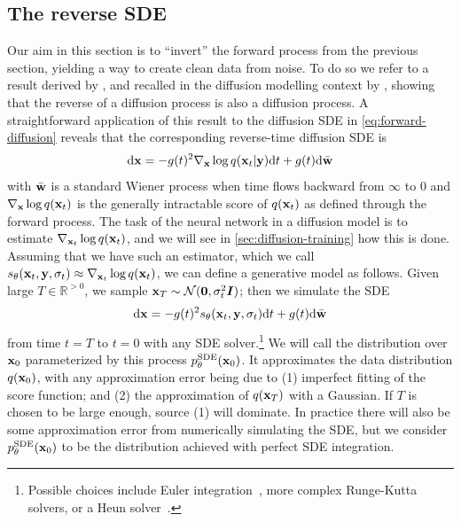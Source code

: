 \subsection{The reverse SDE} \label{sec:diffusion-forward-sde}
Our aim in this section is to ``invert'' the forward process from the previous section, yielding a way to create clean data from noise. To do so we refer to a result  derived by \citet{anderson1982reverse}, and recalled in the diffusion modelling context by \citet{song2020score}, showing that the reverse of a diffusion process is also a diffusion process. A straightforward application of this result to the diffusion SDE in \cref{eq:forward-diffusion} reveals that the corresponding reverse-time diffusion SDE is
\begin{equation} \label{eq:reverse-diffusion}
    \mathrm{d}{\mathbf{x}} = -g(t)^2 \nabla_{\mathbf{x}} \log q({\mathbf{x}}_t|{\mathbf{y}}) \mathrm{d}t + g(t) \mathrm{d}\bar{{\mathbf{w}}}
\end{equation}
with $\bar{{\mathbf{w}}}$ is a standard Wiener process when time flows backward from $\infty$ to $0$ and $\nabla_{\mathbf{x}} \log q({\mathbf{x}}_t)$ is the generally intractable score of $q({\mathbf{x}}_t)$ as defined through the forward process. The task of the neural network in a diffusion model is to estimate $\nabla_{{\mathbf{x}}_t} \log q({\mathbf{x}}_t)$, and we will see in \cref{sec:diffusion-training} how this is done. Assuming that we have such an estimator, which we call $s_\theta({\mathbf{x}}_t, {\mathbf{y}}, \sigma_t) \approx \nabla_{{\mathbf{x}}_t} \log q({\mathbf{x}}_t)$, we can define a generative model as follows. Given large $T \in \mathbb{R}^{>0}$, we sample ${\mathbf{x}}_T \sim {\mathcal{N}}({\bm{0}}, \sigma_t^2 {\bm{I}})$; then we simulate the SDE
\begin{equation} \label{eq:reverse-diffusion-with-nn}
    \mathrm{d}{\mathbf{x}} = -g(t)^2 s_\theta({\mathbf{x}}_t, {\mathbf{y}}, \sigma_t) \mathrm{d}t + g(t) \mathrm{d}\bar{{\mathbf{w}}}
\end{equation}
from time $t=T$ to $t=0$ with any SDE solver.\footnote{Possible choices include Euler integration~\citep{ho2020denoising}, more complex Runge-Kutta~\citep{grathwohl2018ffjord} solvers, or a Heun solver~\citep{karras2022elucidating}.} We will call the distribution over ${\mathbf{x}}_0$ parameterized by this process $p_\theta^\text{SDE}({\mathbf{x}}_0)$. It approximates the data distribution $q({\mathbf{x}}_0)$, with any approximation error being due to (1) imperfect fitting of the score function; and (2) the approximation of $q({\mathbf{x}}_T)$ with a Gaussian. If $T$ is chosen to be large enough, source (1) will dominate. In practice there will also be some approximation error from numerically simulating the SDE, but we consider $p_\theta^\text{SDE}({\mathbf{x}}_0)$ to be the distribution achieved with perfect SDE integration.

